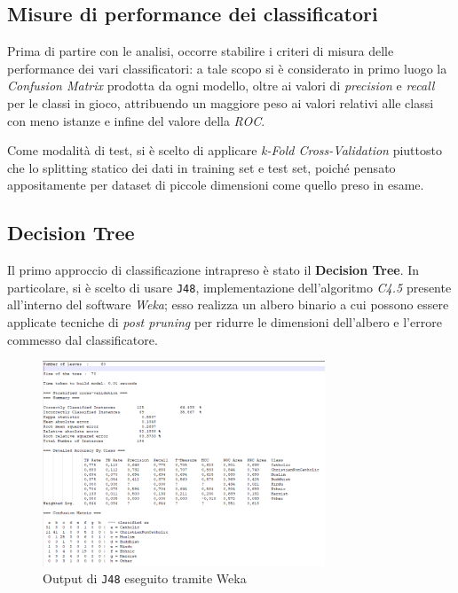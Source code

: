 \documentclass[a4paper,11pt,twoside,notitlepage,final]{scrartcl}
\begin{document}
\subsection{Misure di performance dei classificatori}

Prima di partire con le analisi, occorre stabilire i criteri di misura delle performance dei vari classificatori:
a tale scopo si è considerato in primo luogo la \emph{Confusion Matrix} prodotta da ogni modello, oltre ai valori di \emph{precision} e \emph{recall} per le classi in gioco, attribuendo un maggiore peso ai valori relativi alle classi con meno istanze e infine del valore della \emph{ROC}\@.

Come modalità di test, si è scelto di applicare \emph{k-Fold Cross-Validation} piuttosto che lo splitting statico dei dati in training set e test set, poiché pensato appositamente per dataset di piccole dimensioni come quello preso in esame.


\subsection{Decision Tree}\label{subsec:tree}

Il primo approccio di classificazione intrapreso è stato il \textbf{Decision Tree}.
In particolare, si è scelto di usare \texttt{J48}, implementazione dell'algoritmo \emph{C4.5} presente all'interno del software \emph{Weka};
esso realizza un albero binario a cui possono essere applicate tecniche di \emph{post pruning}
per ridurre le dimensioni dell'albero e l'errore commesso dal classificatore.

\begin{figure}[H]
  \centering
  \includegraphics[width=0.75\textwidth]{fig/DecisionTree1.PNG}%
  \caption{Output di \texttt{J48} eseguito tramite Weka}%
  \label{fig:j48}
\end{figure}
\end{document}
